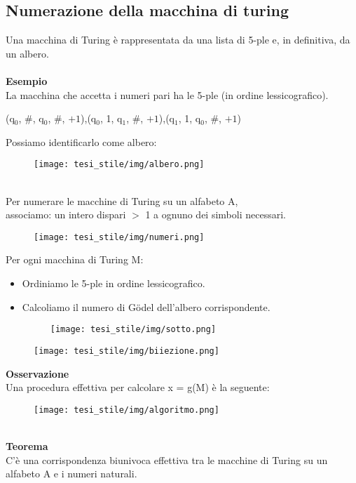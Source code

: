\subsection{Numerazione della macchina di turing}
Una macchina di Turing è rappresentata da una lista di 5-ple e, in definitiva, da un albero.\\\\
\textbf{Esempio}\\
La macchina che accetta i numeri pari ha le 5-ple (in ordine lessicografico).\\
\begin{center}
    (q$_0$, \#, q$_0$, \#, $+1$),(q$_0$, 1, q$_1$, \#, $+1$),(q$_1$, 1, q$_0$, \#, $+1$)
\end{center}
Possiamo identificarlo come albero:
\begin{figure}[htp]
    \centering
     \texttt{[image: tesi\_stile/img/albero.png]}
\end{figure}\\
Per numerare le macchine di Turing su un alfabeto A,\\ 
associamo: un intero dispari $>$ 1 a ognuno dei simboli necessari.\\
\begin{figure}[htp]
    \centering
     \texttt{[image: tesi\_stile/img/numeri.png]}
\end{figure}
\newpage
Per ogni macchina di Turing M:
\begin{itemize}
    \item Ordiniamo le 5-ple in ordine lessicografico.
    
    \item Calcoliamo il numero di Gödel dell’albero corrispondente.\\
    \begin{figure}[htp]
        \centering
        \texttt{[image: tesi\_stile/img/sotto.png]}
     
    \end{figure}
\end{itemize}
\begin{figure}[htp]
    \centering
    \texttt{[image: tesi\_stile/img/biiezione.png]}
\end{figure}
\textbf{Osservazione}\\
Una procedura effettiva per calcolare x = g(M) è la seguente:
\begin{figure}[htp]
    \centering
    \texttt{[image: tesi\_stile/img/algoritmo.png]}
\end{figure}\\
\textbf{Teorema}\\
C’è una corrispondenza biunivoca effettiva tra le macchine di Turing su un alfabeto A e i numeri naturali.
\newpage
